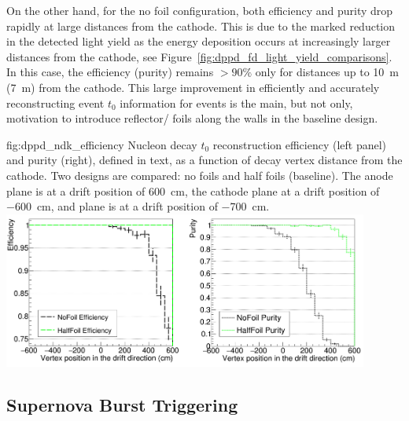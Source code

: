 On the other hand, for the no foil configuration, both efficiency and purity drop rapidly at large distances from the cathode. This is due to the marked reduction in the detected  light yield as the energy deposition occurs at increasingly larger distances from the cathode, see Figure~\ref{fig:dppd_fd_light_yield_comparisons}. In this case, the efficiency (purity) remains $>90\%$ only for distances up to \SI{10}{\m} (\SI{7}{\m}) from the cathode. This large improvement in efficiently and accurately reconstructing event $t_0$ information for  events is the main, but not only, motivation to introduce reflector/ foils along the  walls in the baseline design.

\begin{dunefigure}{fig:dppd_ndk_efficiency}
     {Nucleon decay $t_0$ reconstruction efficiency (left panel) and purity (right), defined in text, as a function of decay vertex distance from the cathode. Two  designs are compared: no foils and half foils (baseline). The anode plane is at a drift position of \SI{+600}{\cm}, the cathode plane at a drift position of \SI{-600}{\cm},  and  plane is at a drift position of \SI{-700}{\cm}.}
    \includegraphics[width=0.90\textwidth]{graphics/dppd_ndk_efficiency.png}
    \end{dunefigure}


\subsection{Supernova Burst Triggering}
\label{subsec:dp-pds-performance_trigger}

